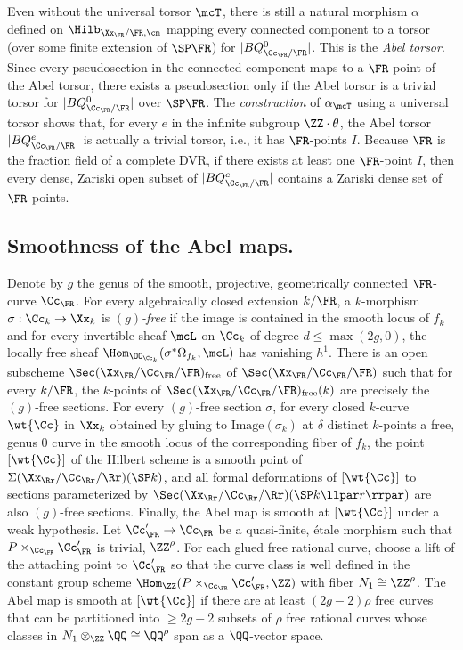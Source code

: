 Even without the universal torsor $\mcT$, there is still a natural morphism $\alpha$ defined on $\Hilb_{\Xx_\FR/\FR,\cm}$ mapping every connected component to a torsor (over some finite extension of $\SP \FR$) for $|BQ^0_{\Cc_\FR/\FR}|$. This is the \emph{Abel torsor}. Since every pseudosection in the connected component maps to a $\FR$-point of the Abel torsor, there exists a pseudosection only if the Abel torsor is a trivial torsor for $|BQ^0_{\Cc_\FR/\FR}|$ over $\SP \FR$. The \emph{construction} of $\alpha_\mcT$ using a universal torsor shows that, for every $e$ in the infinite subgroup $\ZZ\cdot \theta$, the Abel torsor $|BQ^e_{\Cc_\FR/\FR}|$ is actually a trivial torsor, i.e., it has $\FR$-points $I$. Because $\FR$ is the fraction field of a complete DVR, if there exists at least one $\FR$-point $I$, then every dense, Zariski open subset of $|BQ^e_{\Cc_\FR/\FR}|$ contains a Zariski dense set of $\FR$-points.

\subsection{Smoothness of the Abel maps.} \label{subsec-Abelsmooth}
Denote by $g$ the genus of the smooth, projective, geometrically connected $\FR$-curve $\Cc_\FR$. For every algebraically closed extension $k/\FR$, a $k$-morphism $\sigma:\Cc_k\to \Xx_k$ is
\emph{$(g)$-free} if the image is contained in the smooth locus of $f_k$ and for every invertible sheaf $\mcL$ on $\Cc_k$ of degree $d\leq \max(2g,0)$, the locally free sheaf $\Hom_{\OO_{\Cc_k}}(\sigma^*\Omega_{f_k},\mcL)$ has vanishing $h^1$. There is an open subscheme $\Sec(\Xx_\FR/\Cc_\FR/\FR)_{\text{free}}$ of $\Sec(\Xx_\FR/\Cc_\FR/\FR)$ such that for every $k/\FR$, the $k$-points of $\Sec(\Xx_\FR/\Cc_\FR/\FR)_{\text{free}}(k)$ are precisely the $(g)$-free sections. For every $(g)$-free section $\sigma$, for every closed $k$-curve $\wt{\Cc}$ in $\Xx_k$ obtained by gluing to $\text{Image}(\sigma_k)$ at $\delta$ distinct $k$-points a free, genus $0$ curve in the smooth locus of the corresponding fiber of $f_k$, the point $[\wt{\Cc}]$ of the Hilbert scheme is a smooth point of $\Sigma(\Xx_\Rr/\Cc_\Rr/\Rr)(\SP k)$, and all formal deformations of $[\wt{\Cc}]$ to sections parameterized by $\Sec(\Xx_\Rr/\Cc_\Rr/\Rr)(\SP k\llpar r\rrpar)$ are also $(g)$-free sections. Finally, the Abel map is smooth at $[\wt{\Cc}]$ under a weak hypothesis. Let $\Cc'_\FR\to \Cc_\FR$ be a quasi-finite, étale morphism such that $P\times_{\Cc_\FR}\Cc'_\FR$ is trivial, $\ZZ^\rho$. For each glued free rational curve, choose a lift of the attaching point to $\Cc'_\FR$ so that the curve class is well defined in the constant group scheme $\Hom_{\ZZ}(P\times_{\Cc_\FR}\Cc'_\FR,\ZZ)$ with fiber $N_1 \cong
\ZZ^\rho$. The Abel map is smooth at $[\wt{\Cc}]$ if there are at least $(2g-2)\rho$ free curves that can be partitioned into $\geq 2g-2$ subsets of $\rho$ free rational curves whose classes in $N_1\otimes_{\ZZ}\QQ \cong
\QQ^\rho$ span as a $\QQ$-vector space.

